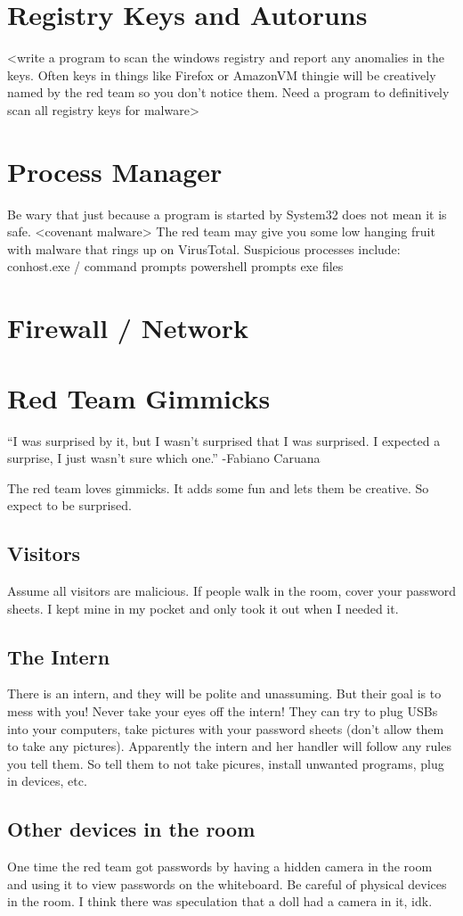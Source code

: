 \documentclass{article}
\begin{document}
\section{Registry Keys and Autoruns}
<write a program to scan the windows registry and report any anomalies in the keys.
Often keys in things like Firefox or AmazonVM thingie will be creatively named by the red team
so you don't notice them. Need a program to definitively scan all registry keys for malware>

\section{Process Manager}
Be wary that just because a program is started by System32 does not mean it is safe. <covenant malware>
The red team may give you some low hanging fruit with malware that rings up on VirusTotal.
Suspicious processes include:
conhost.exe / command prompts
powershell prompts
exe files

\section{Firewall / Network}

\section{Red Team Gimmicks}
“I was surprised by it, but I wasn’t surprised that I was surprised. I expected a surprise, I just wasn’t sure which one.” -Fabiano Caruana

The red team loves gimmicks. It adds some fun and lets them be creative. So expect to be surprised.

\subsection{Visitors}
Assume all visitors are malicious.
If people walk in the room, cover your password sheets. I kept mine in my pocket and only took it out when I needed it. 

\subsection{The Intern}
There is an intern, and they will be polite and unassuming. But their goal is to mess with you! Never take your eyes off the intern!
They can try to plug USBs into your computers, take pictures with your password sheets (don't allow them to take any pictures).
Apparently the intern and her handler will follow any rules you tell them. So tell them to not take picures, install unwanted programs, plug in devices, etc.

\subsection{Other devices in the room}
One time the red team got passwords by having a hidden camera in the room and using it to view passwords on the whiteboard. 
Be careful of physical devices in the room. I think there was speculation that a doll had a camera in it, idk.

\subsection{}
\end{document}

